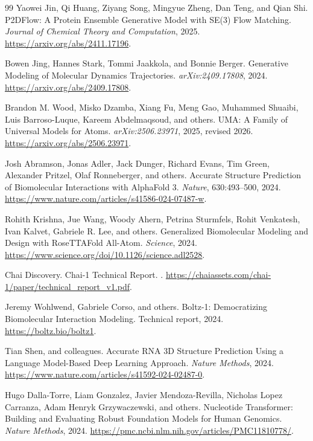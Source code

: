 \documentclass[11pt]{article}
\begin{document}
\begin{thebibliography}{99}
Yaowei Jin, Qi Huang, Ziyang Song, Mingyue Zheng, Dan Teng, and Qian Shi.
\newblock P2DFlow: A Protein Ensemble Generative Model with SE(3) Flow Matching.
\newblock \emph{Journal of Chemical Theory and Computation}, 2025.
\newblock \url{https://arxiv.org/abs/2411.17196}.

Bowen Jing, Hannes Stark, Tommi Jaakkola, and Bonnie Berger.
\newblock Generative Modeling of Molecular Dynamics Trajectories.
\newblock \emph{arXiv:2409.17808}, 2024.
\newblock \url{https://arxiv.org/abs/2409.17808}.

Brandon M. Wood, Misko Dzamba, Xiang Fu, Meng Gao, Muhammed Shuaibi, Luis Barroso-Luque, Kareem Abdelmaqsoud, and others.
\newblock UMA: A Family of Universal Models for Atoms.
\newblock \emph{arXiv:2506.23971}, 2025, revised 2026.
\newblock \url{https://arxiv.org/abs/2506.23971}.

Josh Abramson, Jonas Adler, Jack Dunger, Richard Evans, Tim Green, Alexander Pritzel, Olaf Ronneberger, and others.
\newblock Accurate Structure Prediction of Biomolecular Interactions with AlphaFold 3.
\newblock \emph{Nature}, 630:493--500, 2024.
\newblock \url{https://www.nature.com/articles/s41586-024-07487-w}.

Rohith Krishna, Jue Wang, Woody Ahern, Petrina Sturmfels, Rohit Venkatesh, Ivan Kalvet, Gabriele R. Lee, and others.
\newblock Generalized Biomolecular Modeling and Design with RoseTTAFold All-Atom.
\newblock \emph{Science}, 2024.
\newblock \url{https://www.science.org/doi/10.1126/science.adl2528}.

Chai Discovery.
\newblock Chai-1 Technical Report.
.
\newblock \url{https://chaiassets.com/chai-1/paper/technical_report_v1.pdf}.

Jeremy Wohlwend, Gabriele Corso, and others.
\newblock Boltz-1: Democratizing Biomolecular Interaction Modeling.
\newblock Technical report, 2024.
\newblock \url{https://boltz.bio/boltz1}.

Tian Shen, and colleagues.
\newblock Accurate RNA 3D Structure Prediction Using a Language Model-Based Deep Learning Approach.
\newblock \emph{Nature Methods}, 2024.
\newblock \url{https://www.nature.com/articles/s41592-024-02487-0}.

Hugo Dalla-Torre, Liam Gonzalez, Javier Mendoza-Revilla, Nicholas Lopez Carranza, Adam Henryk Grzywaczewski, and others.
\newblock Nucleotide Transformer: Building and Evaluating Robust Foundation Models for Human Genomics.
\newblock \emph{Nature Methods}, 2024.
\newblock \url{https://pmc.ncbi.nlm.nih.gov/articles/PMC11810778/}.


\end{thebibliography}
\end{document}
